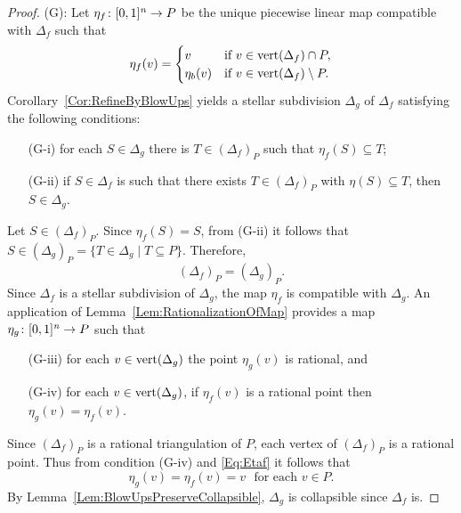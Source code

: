 \documentclass[reqno, draft]{amsart}
\theoremstyle{definition}
\begin{document}
\begin{proof}
 (G):
Let $\eta_f\colon{[0,1]^{\it n}}\to P$ be the unique piecewise linear map 
compatible with $\Delta_f$ such that 
\begin{equation}\label{Eq:Etaf}
  \eta_f(v)=
    \begin{cases}
	 v&\mbox{if }v\in \operatorname{{\rm vert}}(\Delta_f)\cap P,\\
	 \eta_b(v) & \mbox{if }v\in \operatorname{{\rm vert}}(\Delta_f)\setminus P.
    \end{cases}
\end{equation}
Corollary~\ref{Cor:RefineByBlowUps} 
yields a stellar subdivision $\Delta_g$ of 
$\Delta_f$ satisfying the following conditions:
\begin{itemize}
\item[(G-i)]  for each ${S\in\Delta_g}$ there is
$T\in(\Delta_f)_P$  such that $\eta_f(S)\subseteq T$;
\item[(G-ii)] if $S\in\Delta_f$ 
is such that there exists 
$T\in(\Delta_f)_{P}$ with $\eta(S)\subseteq T$, 
then $S\in\Delta_g$.
\end{itemize}
Let $S\in (\Delta_f)_P$. Since $\eta_f(S)=S$,
 from (G-ii) it follows that 
$S\in(\Delta_g)_P=\{T\in\Delta_g\mid T\subseteq P\}$. 
Therefore,
\begin{equation}\label{Eq:DeltafDeltag}
   (\Delta_f)_P=(\Delta_g)_P.
\end{equation}
Since $\Delta_f$ is a stellar subdivision of $\Delta_g$, 
the map $\eta_f$ is compatible with $\Delta_g$. 
An application of Lemma~\ref{Lem:RationalizationOfMap}
provides a map $\eta_g\colon{[0,1]^{\it n}}\to P$ such that
\begin{itemize}
  \item[(G-iii)] for each $v\in\operatorname{{\rm vert}}(\Delta_g)$
    the point $\eta_g(v)$ is  rational, and
  \item[(G-iv)] for each $v\in\operatorname{{\rm vert}}(\Delta_g)$, 
    if $\eta_f(v)$ is a rational point then $\eta_g(v)=\eta_f(v)$.
\end{itemize}
Since $(\Delta_f)_P$ is a rational triangulation of $P$, 
each vertex of $(\Delta_f)_P$ is a rational point. 
Thus from condition (G-iv) and \eqref{Eq:Etaf} it follows that
\begin{equation}\label{Eq:Retract}
  \eta_g(v)=\eta_f(v)=v\,\,\mbox{ for each }v\in P.    
\end{equation}
By Lemma~\ref{Lem:BlowUpsPreserveCollapsible}, 
$\Delta_g$ is collapsible since $\Delta_f$ is.
\medskip


\end{proof}
\end{document}
